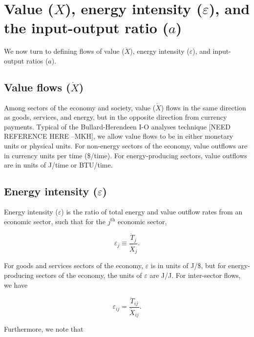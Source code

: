 \documentclass[authoryear,preprint,review,12pt]{elsarticle}
\begin{document}
\section{Value ($X$), energy intensity ($\varepsilon$), and the input-output ratio ($a$)}

We now turn to defining flows of value ($\dot{X}$), energy intensity ($\varepsilon$), and input-output ratios ($a$).

\subsection{Value flows ($\dot{X}$)}

Among sectors of the economy and society, value ($\dot{X}$) flows in the same direction as goods, services, and energy, but in the opposite direction from currency payments. Typical of the Bullard-Herendeen I-O analyses technique [NEED REFERENCE HERE --MKH], we allow value flows to be in either monetary units or physical units. For non-energy sectors of the economy, value outflows are in currency units per time (\$/time). For energy-producing sectors, value outflows are in units of J/time or BTU/time.

\subsection{Energy intensity ($\varepsilon$)}

Energy intensity ($\varepsilon$) is the ratio of total energy and value outflow rates from an economic sector, such that for the $j^{\mathrm{th}}$ economic sector,

\begin{equation} \label{eq:epsilon_output_def}
	\varepsilon_{j} \equiv \frac{\dot{T}_{j}}{\dot{X}_{j}}.
\end{equation}

For goods and services sectors of the economy, $\varepsilon$ is in units of J/\$, but for energy-producing sectors of the economy, the units of $\varepsilon$ are J/J. For inter-sector flows, we have

\begin{equation} \label{eq:epsilon_transfers_1}
	\varepsilon_{ij} = \frac{\dot{T}_{ij}}{\dot{X}_{ij}}.
\end{equation}

\noindent Furthermore, we note that 
\end{document}
